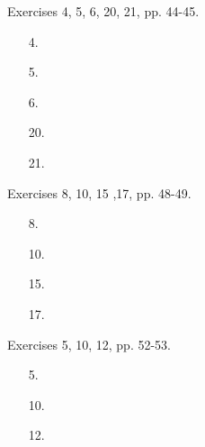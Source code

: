 \documentclass[12pt]{article}
\theoremstyle{remark}
\theoremstyle{named}
\begin{document}
Exercises 4, 5, 6, 20, 21, pp. 44-45.

\begin{enumerate}
    \item [4.]
    \item [5.]
    \item [6.]
    \item [20.]
    \item [21.]
\end{enumerate}

Exercises 8, 10, 15 ,17, pp. 48-49.

\begin{enumerate}
    \item [8.]
    \item [10.]
    \item [15.]
    \item [17.]
\end{enumerate}

Exercises 5, 10, 12, pp. 52-53.

\begin{enumerate}
    \item [5.]
    \item [10.]
    \item [12.]
\end{enumerate}
\end{document}
